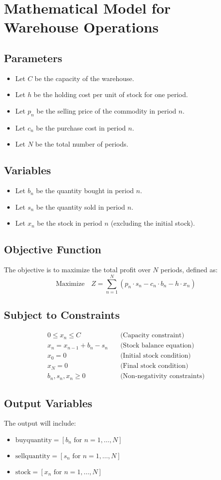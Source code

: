 \documentclass{article}
\begin{document}
\section*{Mathematical Model for Warehouse Operations}

\subsection*{Parameters}
\begin{itemize}
    \item Let \( C \) be the capacity of the warehouse.
    \item Let \( h \) be the holding cost per unit of stock for one period.
    \item Let \( p_n \) be the selling price of the commodity in period \( n \).
    \item Let \( c_n \) be the purchase cost in period \( n \).
    \item Let \( N \) be the total number of periods.
\end{itemize}

\subsection*{Variables}
\begin{itemize}
    \item Let \( b_n \) be the quantity bought in period \( n \).
    \item Let \( s_n \) be the quantity sold in period \( n \).
    \item Let \( x_n \) be the stock in period \( n \) (excluding the initial stock).
\end{itemize}

\subsection*{Objective Function}
The objective is to maximize the total profit over \( N \) periods, defined as:
\[
\text{Maximize} \quad Z = \sum_{n=1}^{N} (p_n \cdot s_n - c_n \cdot b_n - h \cdot x_n)
\]

\subsection*{Subject to Constraints}
\begin{align}
    0 \leq x_n \leq C \quad & \text{(Capacity constraint)} \\
    x_n = x_{n-1} + b_n - s_n \quad & \text{(Stock balance equation)} \\
    x_0 = 0 \quad & \text{(Initial stock condition)} \\
    x_N = 0 \quad & \text{(Final stock condition)} \\
    b_n, s_n, x_n \geq 0 \quad & \text{(Non-negativity constraints)}
\end{align}

\subsection*{Output Variables}
The output will include:
\begin{itemize}
    \item \( \text{buyquantity} = [b_n \text{ for } n=1,\ldots,N] \)
    \item \( \text{sellquantity} = [s_n \text{ for } n=1,\ldots,N] \)
    \item \( \text{stock} = [x_n \text{ for } n=1,\ldots,N] \)
\end{itemize}
\end{document}
